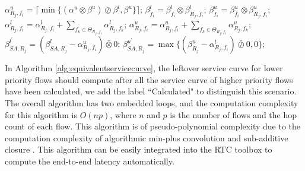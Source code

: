 \documentclass[10pt,journal]{IEEEtran}
\begin{document}
\begin{algorithm}
\begin{algorithmic}[1]
            \STATE $\alpha^u_{R_j,f_i}=\lceil\min\{(\alpha^u\otimes\beta^u)\oslash\beta^l,\beta^u\}\rceil$;
            \STATE $\beta_{f_i}^l=\beta_{f_i}^l\otimes\beta_{R_j,f_i}^l$; $\beta_{f_i}^u=\beta_{f_i}^u\otimes\beta_{R_j,f_i}^u$;
                    \STATE $\alpha^l_{R_j,f_i}=\alpha^l_{R_j,f_i}+\sum_{f_k\in\Theta_{R_j,f_i}}\alpha^l_{R_j,f_k}$;
                    \STATE $\alpha^u_{R_j,f_i}=\alpha^u_{R_j,f_i}+\sum_{f_k\in\Theta_{R_j,f_i}}\alpha^u_{R_j,f_k}$;
                \ENDIF
                \STATE $\beta^{l^\prime}_{SA,R_j}=(\beta^l_{SA,R_j}-\alpha^u_{R_j,f_i})\bar{\otimes}0$;
                \STATE $\beta^{u^\prime}_{SA,R_j}=\max\{(\beta^u_{R_j}-\alpha^l_{R_j,f_i})\bar{\oslash}0,0\}$;
            \ENDIF
        \ENDFOR
    \ENDFOR
\end{algorithmic}
\end{algorithm}

In Algorithm \ref{alg:equivalentservicecurve}, the leftover service curve for lower priority flows should compute after all the service curve of higher priority flows have been calculated, we add the label ``Calculated" to distinguish this scenario. The overall algorithm has two embedded loops, and the computation complexity for this algorithm is $O(np)$, where $n$ and $p$ is the number of flows and the hop count of each flow. This algorithm is of pseudo-polynomial complexity due to the computation complexity of algorithmic min-plus convolution and sub-additive closure \cite{Bouillard2008}. This algorithm can be easily integrated into the RTC toolbox \cite{rtc} to compute the end-to-end latency automatically.
\end{document}
